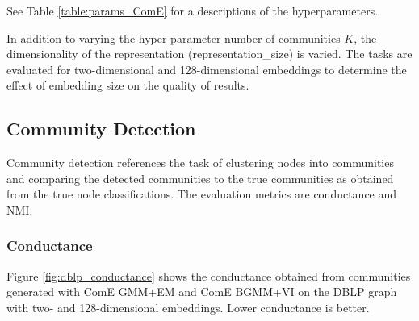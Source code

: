 \documentclass[conference]{IEEEtran}
\begin{document}
See Table \ref{table:params_ComE} for a descriptions of the hyperparameters.

In addition to varying the hyper-parameter number of communities $K$, the dimensionality of the representation (representation\_size) is varied. The tasks are evaluated for two-dimensional and 128-dimensional embeddings to determine the effect of embedding size on the quality of results.


\subsection{Community Detection}

Community detection references the task of clustering nodes into communities and comparing the detected communities to the true communities as obtained from the true node classifications. The evaluation metrics are conductance and NMI.


\subsubsection{Conductance}

Figure \ref{fig:dblp_conductance} shows the conductance obtained from communities generated with ComE GMM+EM and ComE BGMM+VI on the DBLP graph with two- and 128-dimensional embeddings. Lower conductance is better.
\end{document}
